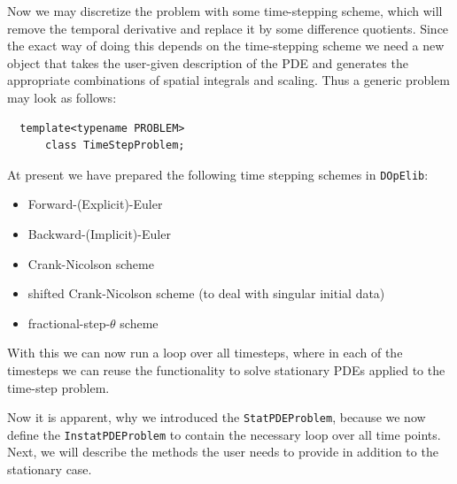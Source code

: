 \documentclass[prodmode,acmtoms]{acmsmall}
\numberwithin{equation}{section}
\newcommand{\dope}{\texttt{DOpElib}}
\begin{document}
Now we may discretize the problem with some time-stepping scheme, which will 
remove the temporal derivative and replace it by some difference quotients. 
Since the exact way of doing this depends on the time-stepping scheme 
we need a new object that takes the user-given description of the PDE and 
generates the appropriate combinations of spatial integrals and scaling.
Thus a generic problem may look as follows:
\begin{lstlisting}
  template<typename PROBLEM>
      class TimeStepProblem;
\end{lstlisting}
At present we have prepared the following time stepping schemes in \dope:
\begin{itemize}
\item Forward-(Explicit)-Euler
\item Backward-(Implicit)-Euler
\item Crank-Nicolson scheme
\item shifted Crank-Nicolson scheme (to deal with singular initial data)
\item fractional-step-$\theta$ scheme
\end{itemize}
With this we can now run a loop over all timesteps, where in each of the 
timesteps we can reuse the functionality to solve stationary PDEs 
applied to the time-step problem. 

Now it is apparent, why we introduced the \texttt{StatPDEProblem}, because
we now define the \texttt{InstatPDEProblem} to contain the necessary 
loop over all time points. Next, we will describe the methods the user needs to 
provide in addition to the stationary case.
\end{document}
